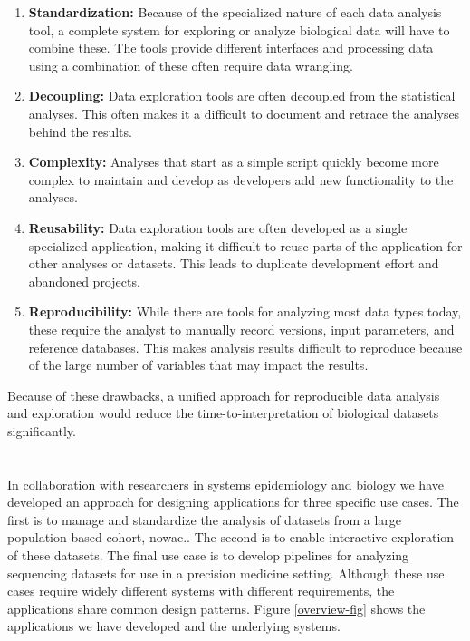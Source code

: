 \begin{enumerate}
    \item \textbf{Standardization:} Because of the specialized nature of each
        data analysis tool, a complete system for exploring or analyze
        biological data will have to combine these. The tools provide different
        interfaces and processing data using a combination of these often
        require data wrangling. 
    \item \textbf{Decoupling:} Data exploration tools are often decoupled from
        the statistical analyses. This often makes it a difficult to document
        and retrace the analyses behind the results. 
    \item \textbf{Complexity:} 
        Analyses that start as a simple script quickly become more complex to
        maintain and develop as developers add new functionality to the
        analyses.
    \item \textbf{Reusability:} Data exploration tools are often
        developed as a single specialized application, making it difficult to
        reuse parts of the application for other analyses or datasets. This
        leads to duplicate development effort and abandoned projects. 
    \item \textbf{Reproducibility:} While there are tools for analyzing most
        data types today, these require the analyst to manually record versions,
        input parameters, and reference databases. This makes analysis results
        difficult to reproduce because of the large number of variables that may
        impact the results. 
\end{enumerate} 

Because of these drawbacks, a unified approach for reproducible data analysis
and exploration would reduce the time-to-interpretation of biological datasets
significantly. 

\section{} 
In collaboration with researchers in systems epidemiology and biology we have
developed an approach for designing applications for three specific use cases.
The first is to manage and standardize the analysis of datasets from a large
population-based cohort, \gls{nowac}.\cite{nowac}. The second is to enable interactive
exploration of these datasets.  The final use case is to develop pipelines for
analyzing sequencing datasets for use in a precision medicine setting.  Although
these use cases require widely different systems with different requirements,
the applications share common design patterns.  Figure \ref{overview-fig} shows
the applications we have developed and the underlying systems. 

